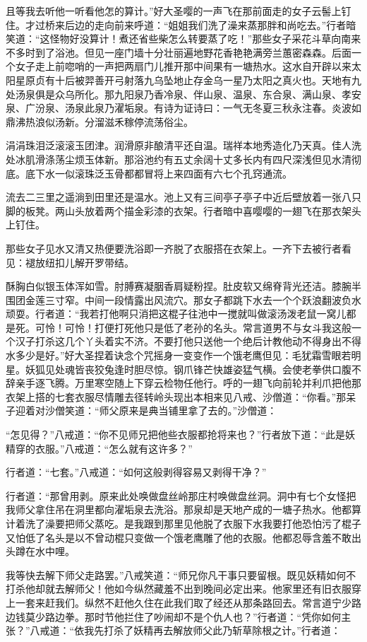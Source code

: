 \documentclass[12pt,UTF8]{ctexbook}
\begin{document}
且等我去听他一听看他怎的算计。”好大圣嘤的一声飞在那前面走的女子云髻上钉住。才过桥来后边的走向前来呼道：“姐姐我们洗了澡来蒸那胖和尚吃去。”行者暗笑道：“这怪物好没算计！煮还省些柴怎么转要蒸了吃！”那些女子采花斗草向南来不多时到了浴池。但见一座门墙十分壮丽遍地野花香艳艳满旁兰蕙密森森。后面一个女子走上前唿哨的一声把两扇门儿推开那中间果有一塘热水。这水自开辟以来太阳星原贞有十后被羿善开弓射落九乌坠地止存金乌一星乃太阳之真火也。天地有九处汤泉俱是众乌所化。那九阳泉乃香冷泉、伴山泉、温泉、东合泉、满山泉、孝安泉、广汾泉、汤泉此泉乃濯垢泉。有诗为证诗曰：一气无冬夏三秋永注春。炎波如鼎沸热浪似汤新。分溜滋禾稼停流荡俗尘。

涓涓珠泪泛滚滚玉团津。润滑原非酿清平还自温。瑞祥本地秀造化乃天真。佳人洗处冰肌滑涤荡尘烦玉体新。那浴池约有五丈余阔十丈多长内有四尺深浅但见水清彻底。底下水一似滚珠泛玉骨都都冒将上来四面有六七个孔窍通流。

流去二三里之遥淌到田里还是温水。池上又有三间亭子亭子中近后壁放着一张八只脚的板凳。两山头放着两个描金彩漆的衣架。行者暗中喜嘤嘤的一翅飞在那衣架头上钉住。

那些女子见水又清又热便要洗浴即一齐脱了衣服搭在衣架上。一齐下去被行者看见：褪放纽扣儿解开罗带结。

酥胸白似银玉体浑如雪。肘膊赛凝胭香肩疑粉捏。肚皮软又绵脊背光还洁。膝腕半围团金莲三寸窄。中间一段情露出风流穴。那女子都跳下水去一个个跃浪翻波负水顽耍。行者道：“我若打他啊只消把这棍子往池中一搅就叫做滚汤泼老鼠一窝儿都是死。可怜！可怜！打便打死他只是低了老孙的名头。常言道男不与女斗我这般一个汉子打杀这几个丫头着实不济。不要打他只送他一个绝后计教他动不得身出不得水多少是好。”好大圣捏着诀念个咒摇身一变变作一个饿老鹰但见：毛犹霜雪眼若明星。妖狐见处魂皆丧狡兔逢时胆尽惊。钢爪锋芒快雄姿猛气横。会使老拳供口腹不辞亲手逐飞腾。万里寒空随上下穿云检物任他行。呼的一翅飞向前轮并利爪把他那衣架上搭的七套衣服尽情雕去径转岭头现出本相来见八戒、沙僧道：“你看。”那呆子迎着对沙僧笑道：“师父原来是典当铺里拿了去的。”沙僧道：

“怎见得？”八戒道：“你不见师兄把他些衣服都抢将来也？”行者放下道：“此是妖精穿的衣服。”八戒道：“怎么就有这许多？”

行者道：“七套。”八戒道：“如何这般剥得容易又剥得干净？”

行者道：“那曾用剥。原来此处唤做盘丝岭那庄村唤做盘丝洞。洞中有七个女怪把我师父拿住吊在洞里都向濯垢泉去洗浴。那泉却是天地产成的一塘子热水。他都算计着洗了澡要把师父蒸吃。是我跟到那里见他脱了衣服下水我要打他恐怕污了棍子又怕低了名头是以不曾动棍只变做一个饿老鹰雕了他的衣服。他都忍辱含羞不敢出头蹲在水中哩。

我等快去解下师父走路罢。”八戒笑道：“师兄你凡干事只要留根。既见妖精如何不打杀他却就去解师父！他如今纵然藏羞不出到晚间必定出来。他家里还有旧衣服穿上一套来赶我们。纵然不赶他久住在此我们取了经还从那条路回去。常言道宁少路边钱莫少路边拳。那时节他拦住了吵闹却不是个仇人也？”行者道：“凭你如何主张？”八戒道：“依我先打杀了妖精再去解放师父此乃斩草除根之计。”行者道：
\end{document}
